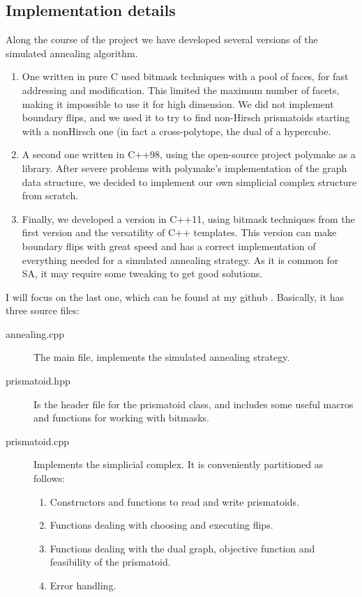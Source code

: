 \documentclass[12pt,a4paper]{article}
\theoremstyle{plain}
\theoremstyle{definition}
\begin{document}
\subsection{Implementation details}

Along the course of the project we have developed several versions of the simulated annealing algorithm.

\begin{enumerate}
  \item One written in pure C used bitmask techniques with a pool of faces, for fast addressing and modification. This limited the maximum number of facets, making it impossible to use it for high dimension. We did not implement boundary flips, and we used it to try to find non-Hirsch prismatoids starting with a nonHirsch one (in fact a cross-polytope, the dual of a hypercube.
  
  \item A second one written in C++98, using the open-source project polymake \cite{polymake} as a library. After severe problems with polymake's implementation of the graph data structure, we decided to implement our own simplicial complex structure from scratch.

  \item Finally, we developed a version in C++11, using bitmask techniques from the first version and the versatility of C++ templates. This version can make boundary flips with great speed and has a correct implementation of everything needed for a simulated annealing strategy. As it is common for SA, it may require some tweaking to get good solutions.
\end{enumerate}

I will focus on the last one, which can be found at my github \cite{github}. Basically, it has three source files:

\begin{description}
  \item[annealing.cpp] The main file, implements the simulated annealing strategy.
  \item[prismatoid.hpp] Is the header file for the prismatoid class, and includes some useful macros and functions for working with bitmasks.
  \item[prismatoid.cpp] Implements the simplicial complex. It is conveniently partitioned as follows:
    \begin{enumerate}
      \item Constructors and functions to read and write prismatoids.
      \item Functions dealing with choosing and executing flips.
      \item Functions dealing with the dual graph, objective function and feasibility of the prismatoid.
      \item Error handling.
    \end{enumerate}
\end{description}
\end{document}
